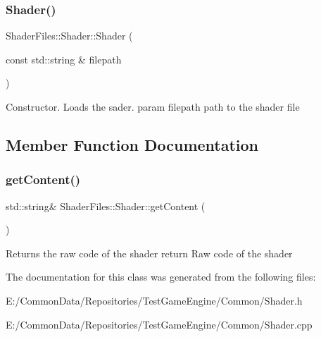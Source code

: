 \subsubsection{\texorpdfstring{Shader()}{Shader()}}
{\footnotesize\ttfamily Shader\+Files\+::\+Shader\+::\+Shader (\begin{DoxyParamCaption}\item[{const std\+::string \&}]{filepath }\end{DoxyParamCaption})}

Constructor. Loads the sader. param filepath path to the shader file 

\subsection{Member Function Documentation}
\mbox{\label{class_shader_files_1_1_shader_aa62cf96b80a461f38e81313699434279}} 
\subsubsection{\texorpdfstring{getContent()}{getContent()}}
{\footnotesize\ttfamily std\+::string\& Shader\+Files\+::\+Shader\+::get\+Content (\begin{DoxyParamCaption}{ }\end{DoxyParamCaption})\hspace{0.3cm}{\ttfamily [inline]}}

Returns the raw code of the shader return Raw code of the shader 

The documentation for this class was generated from the following files\+:\begin{DoxyCompactItemize}
\item 
E\+:/\+Common\+Data/\+Repositories/\+Test\+Game\+Engine/\+Common/Shader.\+h\item 
E\+:/\+Common\+Data/\+Repositories/\+Test\+Game\+Engine/\+Common/Shader.\+cpp\end{DoxyCompactItemize}
